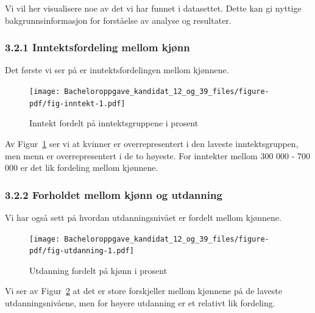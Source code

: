 \documentclass[
  12pt,
  letterpaper,
  DIV=11,
  numbers=noendperiod]{scrartcl}
\begin{document}
Vi vil her visualisere noe av det vi har funnet i datasettet. Dette kan
gi nyttige bakgrunnsinformasjon for forståelse av analyse og resultater.

\hypertarget{inntektsfordeling-mellom-kjuxf8nn}{%
\subsubsection{\texorpdfstring{\textbf{3.2.1 Inntektsfordeling mellom
kjønn}}{3.2.1 Inntektsfordeling mellom kjønn}}\label{inntektsfordeling-mellom-kjuxf8nn}}

Det første vi ser på er inntektsfordelingen mellom kjønnene.

\begin{figure}[H]

{\centering \texttt{[image: Bacheloroppgave\_kandidat\_12\_og\_39\_files/figure-pdf/fig-inntekt-1.pdf]}

}

\caption{\label{fig-inntekt}Inntekt fordelt på inntektsgruppene i
prosent}

\end{figure}

Av Figur~\ref{fig-inntekt} ser vi at kvinner er overrepresentert i den
laveste inntektsgruppen, men menn er overrepresentert i de to høyeste.
For inntekter mellom 300 000 - 700 000 er det lik fordeling mellom
kjønnene.

\hypertarget{forholdet-mellom-kjuxf8nn-og-utdanning}{%
\subsubsection{3.2.2 Forholdet mellom kjønn og
utdanning}\label{forholdet-mellom-kjuxf8nn-og-utdanning}}

Vi har også sett på hvordan utdanningsnivået er fordelt mellom kjønnene.

\begin{figure}[H]

{\centering \texttt{[image: Bacheloroppgave\_kandidat\_12\_og\_39\_files/figure-pdf/fig-utdanning-1.pdf]}

}

\caption{\label{fig-utdanning}Utdanning fordelt på kjønn i prosent}

\end{figure}

Vi ser av Figur~\ref{fig-utdanning} at det er store forskjeller mellom
kjønnene på de laveste utdanningsnivåene, men for høyere utdanning er et
relativt lik fordeling.
\end{document}
